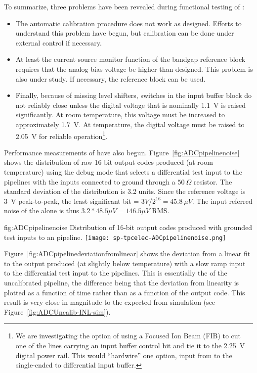 To summarize, three problems have been revealed during functional testing of :
\begin{itemize}
\item The automatic calibration procedure does not work as designed.  Efforts to understand this problem have
begun, but calibration can be done under external control if necessary.
\item At least the current source monitor function of the bandgap reference block requires that the analog bias
voltage be higher than designed.  This problem is also under study.  If necessary, the  reference
block can be used.
\item Finally, because of missing level shifters, switches in the input buffer block do not reliably close
unless the digital voltage that is nominally \SI{1.1}{V} is raised significantly.  At room temperature, this
voltage must be increased to approximately \SI{1.7}{V}.  At \lntwo temperature, the digital voltage must be
raised to \SI{2.05}{V} for reliable operation\footnote{We are investigating the option of using a Focused Ion
Beam (FIB) to cut one of the lines carrying an input buffer control bit and tie it to the \SI{2.25}{V} digital
power rail.  This would ``hardwire'' one option, input from  to the single-ended to differential
input buffer.}.
\end{itemize}

Performance measurements of  have also begun.  Figure~\ref{fig:ADCpipelinenoise} shows the
distribution of raw 16-bit output codes produced (at room temperature) using the debug mode that selects a
differential test input to the pipelines with the inputs connected to ground through a $\SI{50}{\Omega}$
resistor.  The standard deviation of the distribution is 3.2 units.  Since the reference voltage is \SI{3}{V}
peak-to-peak, the least significant bit = $3V$/${2^{16}} = \SI{45.8}{\mu V}$. The input referred noise of the
 alone is thus $3.2 * 48.5 \mu V = 146.5 \mu V$ RMS.

\begin{dunefigure}
{fig:ADCpipelinenoise}
{Distribution of 16-bit output codes produced with grounded test inputs to an  pipeline.}
\texttt{[image: sp-tpcelec-ADCpipelinenoise.png]}
\end{dunefigure}

Figure~\ref{fig:ADCpipelinedeviationfromlinear} shows the deviation from a linear fit to the 
output produced (at slightly below \lntwo temperature) with a slow ramp input to the differential test
input to the  pipelines.  This is essentially the  of the uncalibrated
pipeline, the difference being that the deviation from linearity is plotted as a function of time rather than
as a function of the  output code.  This result is very close in magnitude to the  expected from
simulation (see Figure~\ref{fig:ADCUncalib-INL-sim}).

